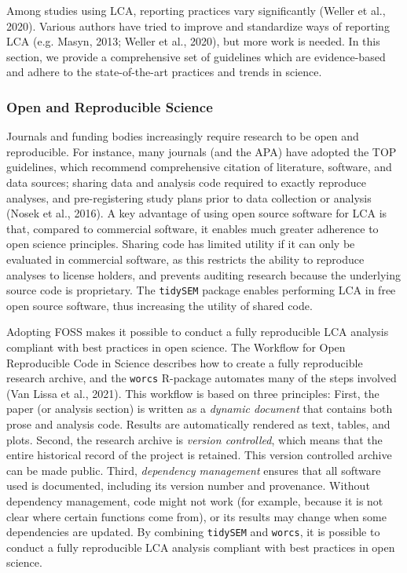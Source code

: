 \documentclass[
  ,man,floatsintext]{apa6}
\begin{document}
Among studies using LCA, reporting practices vary significantly
(Weller et al., 2020).
Various authors have tried to improve and
standardize ways of reporting LCA (e.g. Masyn, 2013; Weller et al., 2020), but more work is needed.
In this section, we provide a comprehensive set of guidelines which are evidence-based and
adhere to the state-of-the-art practices and trends in science.

\hypertarget{open-and-reproducible-science}{%
\subsubsection{Open and Reproducible Science}\label{open-and-reproducible-science}}

Journals and funding bodies increasingly require research to be open and reproducible.
For instance, many journals (and the APA) have adopted the TOP guidelines, which recommend comprehensive citation of literature, software, and data sources;
sharing data and analysis code required to exactly reproduce analyses,
and pre-registering study plans prior to data collection or analysis (Nosek et al., 2016).
A key advantage of using open source software for LCA is that, compared to commercial software, it enables much greater adherence to open science principles.
Sharing code has limited utility if it can only be evaluated in commercial software,
as this restricts the ability to reproduce analyses to license holders,
and prevents auditing research because the underlying source code is proprietary.
The \texttt{tidySEM} package enables performing LCA in free open source software,
thus increasing the utility of shared code.

Adopting FOSS makes it possible to conduct a fully reproducible LCA analysis compliant with best practices in open science.
The Workflow for Open Reproducible Code in Science describes how to create a fully reproducible research archive,
and the \texttt{worcs} R-package automates many of the steps involved (Van Lissa et al., 2021).
This workflow is based on three principles: First,
the paper (or analysis section) is written as a \emph{dynamic document} that contains both prose and analysis code.
Results are automatically rendered as text, tables, and plots.
Second,
the research archive is \emph{version controlled}, which means that the entire historical record of the project is retained.
This version controlled archive can be made public.
Third, \emph{dependency management} ensures that all software used is documented, including its version number and provenance.
Without dependency management, code might not work (for example, because it is not clear where certain functions come from),
or its results may change when some dependencies are updated.
By combining \texttt{tidySEM} and \texttt{worcs},
it is possible to conduct a fully reproducible LCA analysis compliant with best practices in open science.
\end{document}
